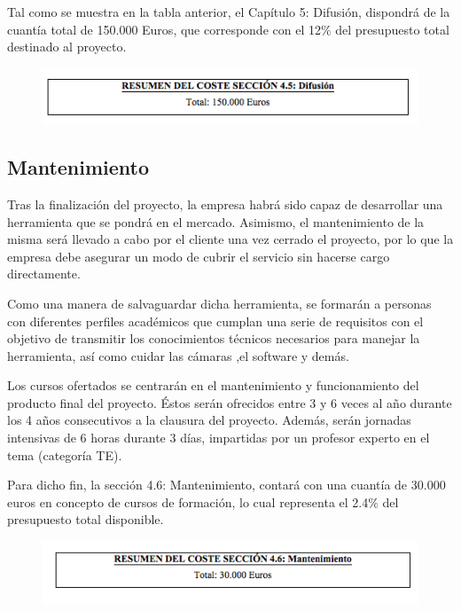 \documentclass[12pt,oneside,a4paper]{article}
\numberwithin{figure}{section}
\begin{document}
Tal como se muestra en la tabla anterior, el Capítulo 5: Difusión, dispondrá de la cuantía total de 150.000 Euros, que corresponde con el 12$\%$ del presupuesto total destinado al proyecto.

\begin{figure}[H]
\begin{center}
\includegraphics[scale=.8]{Difusion2.png}
\end{center}
\end{figure}

\subsection{Mantenimiento}

Tras la finalización del proyecto, la empresa habrá sido capaz de desarrollar una herramienta que se pondrá en el mercado. Asimismo, el mantenimiento de la misma será llevado a cabo por el cliente una vez cerrado el proyecto, por lo que la empresa debe asegurar un modo de cubrir el servicio sin hacerse cargo directamente.

Como una manera de salvaguardar dicha herramienta, se formarán a personas con diferentes perfiles académicos que cumplan una serie de requisitos con el objetivo de transmitir los conocimientos técnicos necesarios para manejar la herramienta, así como cuidar las cámaras ,el software y demás. 

Los cursos ofertados se centrarán en el mantenimiento y funcionamiento del producto final del proyecto. Éstos serán ofrecidos entre 3 y 6 veces al año durante los 4 años consecutivos a la clausura del proyecto. Además, serán jornadas intensivas de 6 horas durante 3 días, impartidas por un profesor experto en el tema (categoría TE).

Para dicho fin, la sección 4.6: Mantenimiento, contará con una cuantía de 30.000 euros en concepto de cursos de formación, lo cual representa el 2.4$\%$ del presupuesto total disponible.

\begin{figure}[H]
\begin{center}
\includegraphics[scale=.8]{Mantenimiento.png}
\end{center}
\end{figure}
\end{document}
